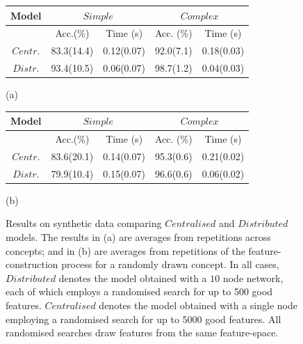 \begin{figure}[htb]
\begin{center}
{\small{
\begin{tabular}{|c|c|c||c|c|}\hline
Model & \multicolumn{2}{|c||}{$Simple$} & \multicolumn{2}{|c|}{$Complex$}\\ \hline
         & Acc.(\%)   & Time (s)        & Acc. (\%)  & Time (s) \\ \cline{2-5}
$Centr.$ & 83.3(14.4) & 0.12(0.07)& 92.0(7.1)  & 0.18(0.03) \\
$Distr.$ & 93.4(10.5) & 0.06(0.07)  & 98.7(1.2)  & 0.04(0.03)\\ \hline
\end{tabular}
}}
\end{center}
\begin{center}
(a) 
\end{center}
\begin{center}
{\small{
\begin{tabular}{|c|c|c||c|c|}\hline
Model & \multicolumn{2}{|c||}{$Simple$} & \multicolumn{2}{|c|}{$Complex$}\\ \hline
         & Acc.(\%)   & Time (s)       & Acc. (\%)  & Time (s) \\ \cline{2-5}
$Centr.$ & 83.6(20.1) & 0.14(0.07)& 95.3(0.6)  & 0.21(0.02) \\
$Distr.$ & 79.9(10.4) & 0.15(0.07)  & 96.6(0.6)  & 0.06(0.02)\\ \hline
\end{tabular}
}}
\end{center}
\begin{center}
(b)
\end{center}

\caption{Results on synthetic data comparing $Centralised$ and $Distributed$ models.
        The results in (a) are averages from repetitions across concepts;
        and in (b) are averages from repetitions of the feature-construction process
        for a randomly drawn concept. In all cases, $Distributed$ denotes
        the model obtained with a $10$ node network, each of which employs
        a randomised search for up to 500 good features. $Centralised$ denotes
        the model obtained with a single node employing a randomised search
        for up to 5000 good features. All randomised searches draw features
        from the same feature-space.}
\label{fig:tab1}
\end{figure}%



